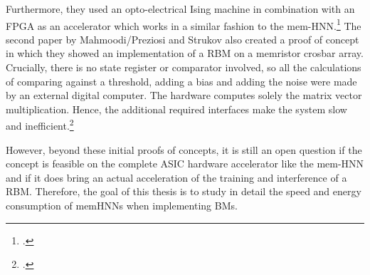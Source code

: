 Furthermore, they used an opto-electrical Ising machine in combination with an \ac{FPGA} as an accelerator which works in a similar fashion to the \ac{mem-HNN}.\footcite[cf.][1-11]{bohmNoiseinjectedAnalogIsing2022}
The second paper by Mahmoodi/Preziosi and Strukov also created a proof of concept in which they showed an implementation of a \ac{RBM} on a memristor crosbar array.
Crucially, there is no state register or comparator involved, so all the calculations of comparing against a threshold, adding a bias and adding the noise were made by an external digital computer. 
The hardware computes solely the matrix vector multiplication.
Hence, the additional required interfaces make the system slow and inefficient.\footcite[cf.][1-8]{mahmoodiVersatileStochasticDot2019}

However, beyond these initial proofs of concepts, it is still an open question if the concept
is feasible on the complete \ac{ASIC} hardware accelerator like the \ac{mem-HNN} and if it does bring an actual acceleration of the training and interference of a \ac{RBM}.
Therefore, the goal of this thesis is to study in detail the speed and energy consumption of memHNNs when implementing BMs.
